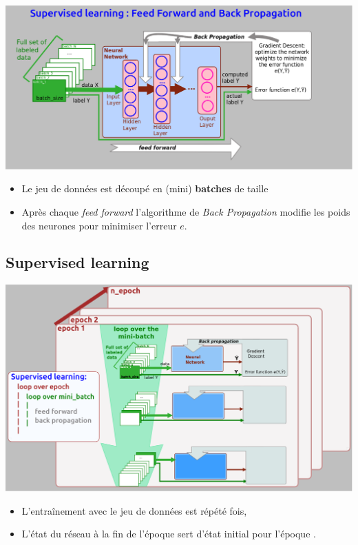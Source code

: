 \documentclass[10pt,serif,mathserif,compress,hyperref={colorlinks}]{beamer}
\begin{document}
\begin{frame}{}
  \includegraphics[width=1.2\textwidth]{./images/NetworkTraining.png}
  \vspace*{-3mm}\begin{itemize}
  \item Le jeu de données est découpé en (mini) {\bf batches} de taille 
  \item Après chaque {\em feed forward} l'algorithme de {\em Back Propagation} modifie les poids
    des neurones pour minimiser l'erreur $e$.
  \end{itemize}
\end{frame}

\subsection{Supervised learning}

\begin{frame}{}
  \includegraphics[width=\textwidth]{./images/NetworkTraining_2.png}
  \vspace*{-3mm}\begin{itemize}
  \item L'entraînement avec le jeu de données est répété  fois,
  \item L'état du réseau à la fin de l'époque  sert d'état initial pour l'époque .
  \end{itemize}
  
\end{frame}

 
\end{document}
